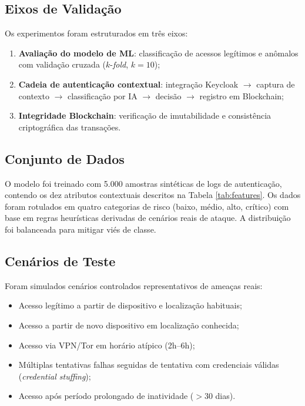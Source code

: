 \documentclass[12pt,a4paper]{article}
\begin{document}
\subsection{Eixos de Validação}

Os experimentos foram estruturados em três eixos:

\begin{enumerate}
    \item \textbf{Avaliação do modelo de ML}: classificação de acessos legítimos e anômalos com validação cruzada ($k$-\textit{fold}, $k=10$);
    \item \textbf{Cadeia de autenticação contextual}: integração Keycloak $\rightarrow$ captura de contexto $\rightarrow$ classificação por IA $\rightarrow$ decisão $\rightarrow$ registro em Blockchain;
    \item \textbf{Integridade Blockchain}: verificação de imutabilidade e consistência criptográfica das transações.
\end{enumerate}

\subsection{Conjunto de Dados}

O modelo foi treinado com 5.000 amostras sintéticas de logs de autenticação, contendo os dez atributos contextuais descritos na Tabela \ref{tab:features}. Os dados foram rotulados em quatro categorias de risco (baixo, médio, alto, crítico) com base em regras heurísticas derivadas de cenários reais de ataque. A distribuição foi balanceada para mitigar viés de classe.

\subsection{Cenários de Teste}

Foram simulados cenários controlados representativos de ameaças reais:

\begin{itemize}
    \item Acesso legítimo a partir de dispositivo e localização habituais;
    \item Acesso a partir de novo dispositivo em localização conhecida;
    \item Acesso via VPN/Tor em horário atípico (2h--6h);
    \item Múltiplas tentativas falhas seguidas de tentativa com credenciais válidas (\textit{credential stuffing});
    \item Acesso após período prolongado de inatividade ($>30$ dias).
\end{itemize}
\end{document}

